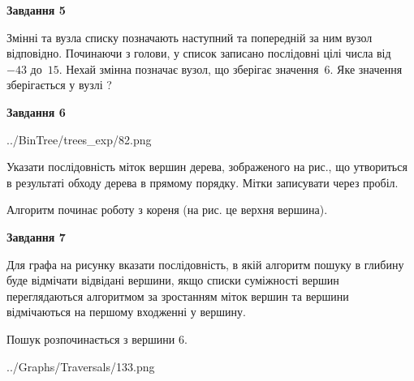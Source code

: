 \documentclass[12pt, ukrainian]{article}
\begin{document}
{\begin {large}
{\begin {center}\textbf{Завдання 5}\end {center}}\par
Змінні  та  вузла списку позначають наступний та попередній за ним вузол відповідно. Починаючи з голови, у список записано послідовні цілі числа від~$-43$ до~$15$. Нехай змінна  позначає вузол, що зберігає значення~$6$.
Яке значення зберігається у вузлі  ?\par
\newpage

{\begin {center}\textbf{Завдання 6}\end {center}}\par

\begin{center}
	{../BinTree/trees_exp/82.png}
\end{center}
Указати послідовність міток вершин дерева, зображеного на рис., що утвориться в результаті обходу дерева в прямому порядку. Мітки записувати через пробіл.\par Алгоритм починає роботу з кореня (на рис. це верхня вершина).\par
\newpage

{\begin {center}\textbf{Завдання 7}\end {center}}\par
Для графа на рисунку вказати послідовність, в якій алгоритм пошуку в глибину буде відмічати відвідані вершини, якщо списки суміжності вершин переглядаються алгоритмом за зростанням міток вершин та вершини відмічаються на першому вход\-женні у вершину.\par
Пошук розпочинається з вершини 6.\par

\begin{center}
	{../Graphs/Traversals/133.png}
\end{center}\par
\newpage


\end{large}}
\end{document}

